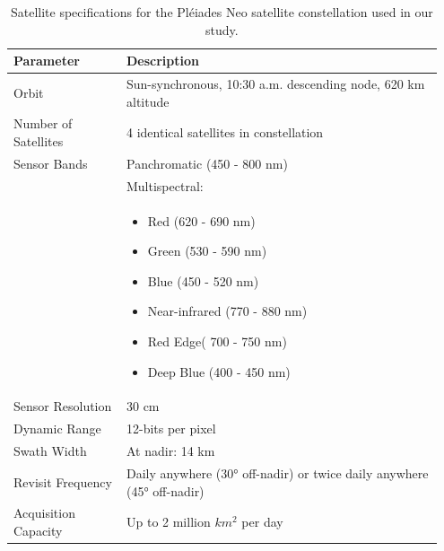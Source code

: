 \documentclass[12pt,twoside]{gsag3jnl}
\begin{document}
\begin{table}[h!]
\centering
\begin{tabular}{|p{0.25\linewidth}|p{0.7\linewidth}|}
\hline
\textbf{Parameter}            & \textbf{Description}                                        \\ \hline
Orbit                         & Sun-synchronous, 10:30 a.m. descending node, 620 km altitude \\ \hline
Number of Satellites          & 4 identical satellites in constellation                      \\ \hline
Sensor Bands                  & Panchromatic (450 - 800 nm)\\ \cline{2-2} 
                              & Multispectral:\\
                              & \begin{itemize}
                                  \item Red (620 - 690 nm)
                                  \item Green (530 - 590 nm)
                                  \item Blue (450 - 520 nm)
                                  \item Near-infrared (770 - 880 nm)
                                  \item Red Edge( 700 - 750 nm)
                                  \item Deep Blue (400 - 450 nm)  
                                \end{itemize} \\ \hline
Sensor Resolution             & 30 cm                                                        \\ \hline
Dynamic Range                 & 12-bits per pixel                                            \\ \hline
Swath Width                   & At nadir: 14 km                                               \\ \hline
Revisit Frequency             & Daily anywhere (30° off-nadir) or twice daily anywhere (45° off-nadir) \\ \hline
Acquisition Capacity          & Up to 2 million $km^2$ per day                               \\ \hline
\end{tabular}
\caption{Satellite specifications for the Pléiades Neo satellite constellation used in our study.}
\label{tab:satellite_specs}
\end{table}
\end{document}
